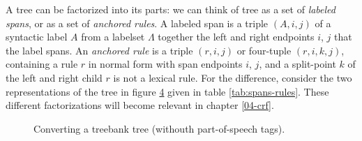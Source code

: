     A tree can be factorized into its parts: we can think of tree as a set of \textit{labeled spans}, or as a set of \textit{anchored rules}. A labeled span is a triple $(A, i, j)$ of a syntactic label $A$ from a labelset $\Lambda$ together the left and right endpoints $i$, $j$ that the label spans. An \textit{anchored rule} is a triple $(r, i, j)$ or four-tuple $(r, i, k, j)$, containing a rule $r$ in normal form with span endpoints $i$, $j$, and a split-point $k$ of the left and right child $r$ is not a lexical rule. For the difference, consider the two representations of the tree in figure \ref{fig:tree-cnf-spans} given in table \ref{tab:spans-rules}. These different factorizations will become relevant in chapter \ref{04-crf}.

    \begin{figure}

      \begin{subfigure}[b]{\textwidth}
        \center
        \begin{tikzpicture}[scale=.6]
          
        \end{tikzpicture}
    		\label{fig:tree-original}
      \end{subfigure}

      \begin{subfigure}[b]{\textwidth}
        \center
        \begin{tikzpicture}[scale=.6]
    		  
        \end{tikzpicture}
        \tiny
    		\label{fig:tree-simplified}
      \end{subfigure}

      \begin{subfigure}[b]{\textwidth}
        \center
        \begin{tikzpicture}[scale=.6]
    		  
        \end{tikzpicture}
        \tiny
    		\label{fig:tree-cnf}
      \end{subfigure}

      \begin{subfigure}[b]{\textwidth}
        \center
        \begin{tikzpicture}[scale=.6]
    		  
        \end{tikzpicture}
        \tiny
    		\label{fig:tree-cnf-spans}
      \end{subfigure}

    \caption{Converting a treebank tree (withouth part-of-speech tags).}
    \label{fig:trees-ptb}
    \end{figure}

